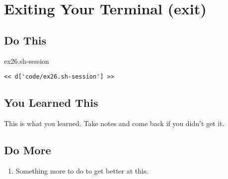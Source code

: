 \chapter{Exiting Your Terminal (exit)}

\section{Do This}

\begin{code}{ex26.sh-session}
\begin{Verbatim}
<< d['code/ex26.sh-session'] >>
\end{Verbatim}
\end{code}


\section{You Learned This}

This is what you learned.  Take notes and come back if you didn't get it.

\section{Do More}

\begin{enumerate}
\item Something more to do to get better at this.
\end{enumerate}


